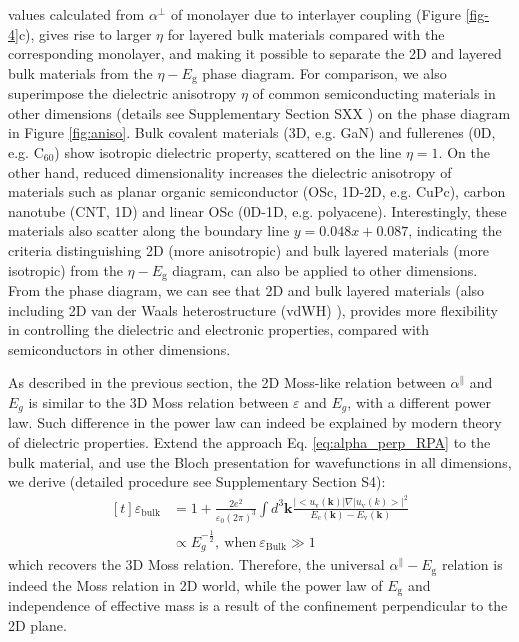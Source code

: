 \documentclass[journal=ancac3,manuscript=article,email=true,hyperref=true,keywords=false]{achemso}
\begin{document}
values calculated from $\alpha^{\perp}$ of monolayer due to interlayer
coupling (Figure \ref{fig-4}c), gives rise to larger $\eta$ for
layered bulk materials compared with the corresponding monolayer, and
making it possible to separate the 2D and layered bulk materials from
the $\eta-E_{\mathrm{g}}$ phase diagram. For comparison, we also
superimpose the dielectric anisotropy $\eta$ of common semiconducting
materials in other dimensions (details see Supplementary Section SXX
) on the phase diagram in Figure \ref{fig:aniso}. Bulk
covalent materials (3D, e.g. GaN) and fullerenes (0D, e.g. C$_{60}$)
show isotropic dielectric property, scattered on the line $\eta=1$. On
the other hand, reduced dimensionality increases the dielectric
anisotropy of materials such as planar organic semiconductor (OSc,
1D-2D, e.g. CuPc), carbon nanotube (CNT, 1D) and linear OSc (0D-1D,
e.g. polyacene). Interestingly, these materials also scatter along the
boundary line $y=0.048x+0.087$, indicating the criteria distinguishing
2D (more anisotropic) and bulk layered materials (more isotropic) from
the $\eta-E_{\mathrm{g}}$ diagram, can also be applied to other
dimensions. From the phase diagram, we can see that 2D and bulk
layered materials (also including 2D van der Waals heterostructure
(vdWH) \cite{Novoselov_2016}), provides more flexibility in
controlling the dielectric and electronic properties, compared with semiconductors in other dimensions.


As described in the previous section, the 2D Moss-like relation
between $\alpha^{\parallel}$ and $E_{g}$ is similar to the 3D Moss
relation between $\varepsilon$ and $E_{g}$, with a different power
law. Such difference in the power law can indeed be explained by
modern theory of dielectric properties.  Extend the approach
Eq. \ref{eq:alpha_perp_RPA} to the bulk material, and use the Bloch
presentation for wavefunctions in all dimensions, we derive (detailed
procedure see Supplementary Section S4):
\begin{equation}
  \label{eq:alpha-Eg-3D}
  \begin{aligned}[t]
  \varepsilon_{\mathrm{bulk}} &= 1 + \frac{2e^{2}}{\varepsilon_{0}(2\pi)^{3}}\int d^{3}\mathbf{k}
  \frac{|<u_{\mathrm{v}}(\mathbf{k})|\nabla|u_{\mathrm{v}}(k)>|^{2}}
  {E_{\mathrm{c}}(\mathbf{k}) - E_{\mathrm{v}}(\mathbf{k})} \\
  &\propto E_{g}^{-\frac{1}{2}},\ \mathrm{when}\ \varepsilon_{\mathrm{Bulk}} \gg 1
\end{aligned}
\end{equation}
which recovers the 3D Moss relation. Therefore, the universal
$\alpha^{\parallel}-E_{\mathrm{g}}$ relation is indeed the Moss
relation in 2D world, while the power law of $E_{\mathrm{g}}$ and
independence of effective mass is a result of the confinement
perpendicular to the 2D plane. 
\end{document}
